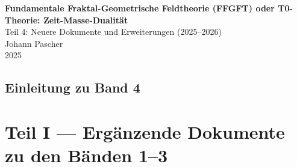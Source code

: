 


	
	\setcounter{section}{0}
	\setcounter{subsection}{0}
	\setcounter{subsubsection}{0}
	\setcounter{paragraph}{0}
	
	\setcounter{secnumdepth}{1}  %
	\makeatletter
	\renewcommand*\l@part[2]{%
		\ifnum \c@tocdepth >-2\relax
		\addpenalty{-\@highpenalty}%
		\addvspace{0.8em \@plus\p@}%
		{\leftskip 0em \relax
			\rightskip \@tocrmarg
			\parfillskip -\rightskip
			\parindent 0em \relax\@afterindenttrue
			\interlinepenalty\@M
			\leavevmode
			{\footnotesize\bfseries #1}\nobreak
			\leaders\hbox{$\m@th\mkern \@dotsep mu\hbox{}\mkern \@dotsep mu$}\hfill
			\nobreak\hb@xt@\@pnumwidth{\hss #2}\par}%
		\addvspace{0.2em \@plus\p@}%
		\nobreak
		\fi}
	\makeatother
	
	\renewcommand{\cftchapfont}{\footnotesize\bfseries}
	\renewcommand{\cftchappagefont}{\footnotesize\bfseries}
	\setlength{\cftbeforechapskip}{0.3em}
	
	\setcounter{tocdepth}{0}
	\begin{titlepage}
		\centering
		\vspace*{2cm}

		

	{\Huge\textbf{Fundamentale Fraktal-Geometrische Feldtheorie (FFGFT) oder T0-Theorie: Zeit-Masse-Dualität}}\\[1cm]
	{\Large Teil 4: Neuere Dokumente und Erweiterungen (2025--2026)}\\[2cm]		
		{\large Johann Pascher}\\[1cm]
		
		{\large 2025}
		
		\vfill
	\end{titlepage}
	
	\frontmatter
	\pagestyle{fancy}
	\makeatletter
	\let\ps@plain\ps@fancy
	\let\ps@empty\ps@fancy
	\makeatother
	
		\mainmatter
	\chapter{Einleitung zu Band 4}
	
	
	\part{Teil I --- Ergänzende Dokumente zu den Bänden 1--3}
